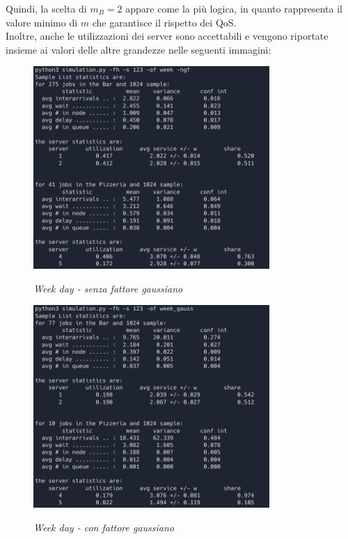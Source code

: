 \documentclass[a4paper, 12pt]{article}
\begin{document}
Quindi, la scelta di $m_B = 2$ appare come la più logica, in quanto rappresenta il valore minimo di $m$ che garantisce il rispetto dei QoS.\\

Inoltre, anche le utilizzazioni dei server sono accettabili e vengono riportate insieme ai valori delle altre grandezze nelle seguenti immagini:

\begin{minipage}{0.5\textwidth}
\begin{figure}[H]
\centering
\includegraphics[width=0.8\textwidth]{finite_horizont_output_week_ngf}

\textit{Week day - senza fattore gaussiano}
\end{figure}
\end{minipage}
\begin{minipage}{0.5\textwidth}
\begin{figure}[H]
\centering
\includegraphics[width=0.8\textwidth]{finite_horizont_output_week_g}

\textit{Week day - con fattore gaussiano}
\end{figure}
\end{minipage}
\end{document}
